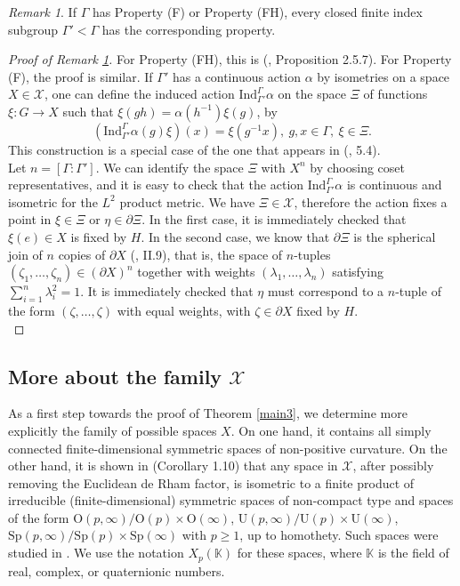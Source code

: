 \documentclass{article}
\theoremstyle{definition}
\theoremstyle{remark}
\newtheorem{rmk}[dfn]{Remark}
\theoremstyle{plain}
\begin{document}
\begin{rmk} \label{fiffh}
    If $\Gamma$ has Property (F) or Property (FH), every closed finite index subgroup $\Gamma'<\Gamma$ has the corresponding property.
\end{rmk}

\begin{proof}[Proof of Remark \ref{fiffh}]
    For Property (FH), this is (\cite{kazhdanT}, Proposition 2.5.7). For Property (F), the proof is similar. If $\Gamma'$ has a continuous action $\alpha$ by isometries on a space $X\in\mathcal{X}$, one can define the induced action $\mathrm{Ind}_{\Gamma'}^{\Gamma}{\alpha}$ on the space $\Xi$ of functions $\xi: G\rightarrow X$ such that $\xi(gh)=\alpha(h^{-1})\xi(g)$, by $$\left(\mathrm{Ind}_{\Gamma'}^{\Gamma}{\alpha}(g)\xi\right)(x)=\xi(g^{-1}x),\ g,x\in\Gamma,\ \xi\in\Xi.$$ This construction is a special case of the one that appears in (\cite{splitting}, 5.4). \\
    
    Let $n=[\Gamma:\Gamma']$. We can identify the space $\Xi$ with $X^n$ by choosing coset representatives, and it is easy to check that the action $\mathrm{Ind}_{\Gamma'}^{\Gamma}{\alpha}$ is continuous and isometric for the $L^2$ product metric. We have $\Xi\in\mathcal{X}$, therefore the action fixes a point in $\xi\in\Xi$ or $\eta\in\partial\Xi$. In the first case, it is immediately checked that $\xi(e)\in X$ is fixed by $H$. In the second case, we know that $\partial\Xi$ is the spherical join of $n$ copies of $\partial X$ (\cite{bh}, II.9), that is, the space of $n$-tuples $(\zeta_1,\ldots,\zeta_n)\in(\partial X)^n$ together with weights $(\lambda_1,\ldots,\lambda_n)$ satisfying $\sum_{i=1}^{n}{\lambda_i^2}=1$. It is immediately checked that $\eta$ must correspond to a $n$-tuple of the form $(\zeta,\ldots,\zeta)$ with equal weights, with $\zeta\in\partial X$ fixed by $H$. \\
\end{proof}

\subsection{More about the family $\mathcal{X}$} \label{morefamily}

As a first step towards the proof of Theorem \ref{main3}, we determine more explicitly the family of possible spaces $X$. On one hand, it contains all simply connected finite-dimensional symmetric spaces of non-positive curvature. On the other hand, it is shown in \cite{duc2015} (Corollary 1.10) that any space in $\mathcal{X}$, after possibly removing the Euclidean de Rham factor, is isometric to a finite product of irreducible (finite-dimensional) symmetric spaces of non-compact type and spaces of the form $\mathrm{O}(p,\infty)/\mathrm{O}(p)\times\mathrm{O}(\infty)$, $\mathrm{U}(p,\infty)/\mathrm{U}(p)\times\mathrm{U}(\infty)$, $\mathrm{Sp}(p,\infty)/\mathrm{Sp}(p)\times\mathrm{Sp}(\infty)$ with $p\geq 1$, up to homothety. Such spaces were studied in \cite{duc2013}. We use the notation $X_p(\mathbb{K})$ for these spaces, where $\mathbb{K}$ is the field of real, complex, or quaternionic numbers. \\
\end{document}
